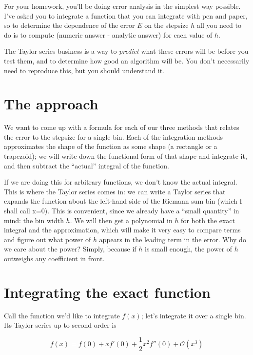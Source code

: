 \documentclass[12ampt]{article}
\begin{document}
\Large
\centerline{} 
\normalsize

For your homework, you'll be doing error analysis in the simplest way possible. I've asked you to integrate a function that you can integrate with pen and paper, so 
to determine the dependence of the error $E$ on the stepsize $h$ all you need to do is to compute (numeric answer - analytic answer) for each value of $h$.

The Taylor series business is a way to {\it predict} what these errors will be before you test them, and to determine how good an algorithm will be. You don't necessarily
need to reproduce this, but you should understand it.

\section{The approach}

We want to come up with a formula for each of our three methods that relates the error to the stepsize for a single bin. Each of the integration methods approximates the 
shape of the function as some shape (a rectangle or a trapezoid); we will write down the functional form of that shape and integrate it, and then subtract the ``actual'' integral
of the function.

If we are doing this for arbitrary functions, we don't know the actual integral. This is where the Taylor series comes in: we can write a Taylor series that expands the function
about the left-hand side of the Riemann sum bin (which I shall call x=0). This is convenient, since we already have a ``small quantity'' in mind: the bin width $h$. We will then
get a polynomial in $h$ for both the exact integral and the approximation, which will make it very easy to compare terms and figure out what power of $h$ appears in the leading term
in the error. Why do we care about the power? Simply, because if $h$ is small enough, the power of $h$ outweighs any coefficient in front.

\section{Integrating the exact function}

Call the function we'd like to integrate $f(x)$; let's integrate it over a single bin. Its Taylor series up to second order is

\begin{equation}
  f(x) = f(0) + xf'(0) + \frac{1}{2} x^2 f''(0) + \mathcal O(x^3)
\end{equation}
\end{document}
